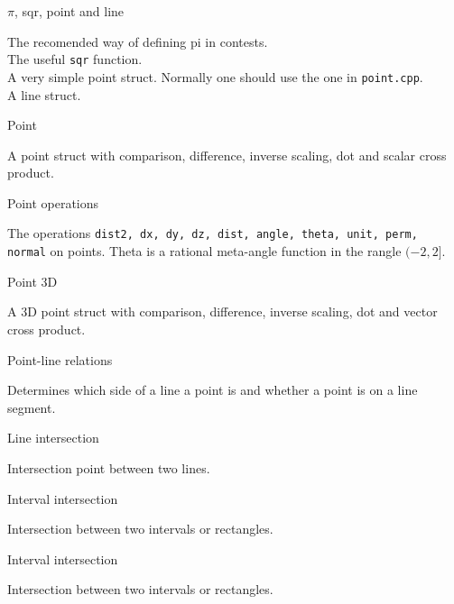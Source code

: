 \begin{algorithm}{$\pi$, sqr, point and line}

The recomended way of defining pi in contests. \\
The useful {\tt sqr} function. \\
A very simple point struct.
Normally one should use the one in {\tt point.cpp}. \\
A line struct.
\end{algorithm}

\begin{algorithm}{Point}

A point struct with comparison, difference, inverse scaling, dot and
scalar cross product.
\end{algorithm}

\begin{algorithm}{Point operations}

The operations {\tt dist2, dx, dy, dz, dist, angle, theta, unit, perm, normal}
on points. Theta is a rational meta-angle function in the rangle $(-2,2]$.
\end{algorithm}

\begin{algorithm}{Point 3D}

A 3D point struct with comparison, difference, inverse scaling, dot and
vector cross product.
\end{algorithm}

\begin{algorithm}{Point-line relations}

Determines which side of a line a point is and whether a point is on a line
segment.
\end{algorithm}

\begin{algorithm}{Line intersection}

Intersection point between two lines.
\end{algorithm}

\begin{algorithm}{Interval intersection}

Intersection between two intervals or rectangles.
\end{algorithm}

\begin{algorithm}{Interval intersection}

Intersection between two intervals or rectangles.
\end{algorithm}

